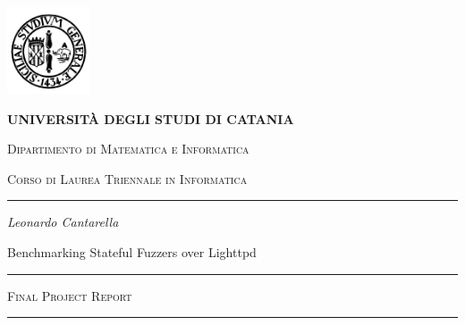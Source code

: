 \begin{titlepage}
\centering 
\includegraphics[width=2.434cm,height=2.565cm]{Images/university_logo.png}

\bigskip

{\Large \textbf{UNIVERSIT\`A DEGLI STUDI DI CATANIA}}

{\scshape
\large
Dipartimento di Matematica e Informatica
}

{\scshape
\normalsize
Corso di Laurea Triennale in Informatica
}

\bigskip


\hrule


\bigskip


\bigskip


\bigskip


\bigskip

{\itshape
\large
Leonardo Cantarella
\par}


\bigskip


\bigskip


\bigskip


\bigskip

{\centering
\Large
Benchmarking Stateful Fuzzers over Lighttpd
\par}


\bigskip


\bigskip


\bigskip


\bigskip


\bigskip


\bigskip


\begin{minipage}[b]{8 cm}
\hrule

\bigskip

{\centering\scshape 
Final Project Report
\par}


\bigskip

\hrule
\end{minipage}
\bigskip


\bigskip


\bigskip


\bigskip


\bigskip


\bigskip



\end{titlepage}
